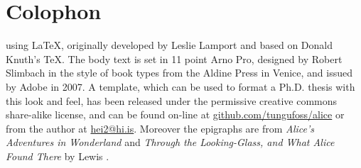 \chapter*{Colophon}

\begin{center}
	\parbox{200pt}{\raggedright {} using \LaTeX, originally developed by Leslie Lamport and based on Donald Knuth's \TeX. The body text is set in 11 point Arno Pro, designed by Robert Slimbach in the style of book types from the Aldine Press in Venice, and issued by Adobe in 2007. A template, which can be used to format a Ph.D. thesis with this look and feel, has been released under the permissive creative commons share-alike license, and can be found on-line at \href{https://github.com/tungufoss/alice/tree/master/Papers/Thesis}{github.com/tungufoss/alice} or from the author at \href{mailto:hei2@hi.is}{hei2@hi.is}. 
		Moreover the epigraphs are from \emph{Alice's Adventures in Wonderland} \citeyearpar{alice} and \emph{Through the Looking-Glass, and What Alice Found There} \citeyearpar{lookingglass} by Lewis \citeauthor{alice}.}
\end{center}